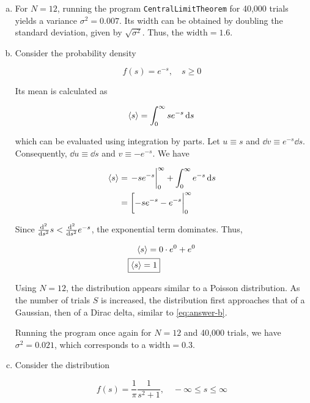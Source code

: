 \documentclass[12pt,a4paper,twocolumn]{article}
\begin{document}
\begin{enumerate}[(a)]
\item For $N = 12$, running the program \texttt{CentralLimitTheorem} for 40,000 trials yields a variance $\sigma^2 = 0.007$. Its width can be obtained by doubling the standard deviation, given by $\sqrt{\sigma^2}$. Thus, the $\boxed{\mathrm{width} = 1.6}$.

\item Consider the probability density

\begin{equation}
	f(s) = e^{-s} , \quad s \geq 0
\end{equation}

Its mean is calculated as 

\begin{equation}
	\ev{s} = \int_0^\infty se^{-s} \dd{s} \\
\end{equation}

which can be evaluated using integration by parts. Let $u \equiv s$ and $\dd{v} \equiv e^{-s} \dd{s}$. Consequently, $\dd{u} \equiv \dd{s}$ and $v \equiv -e^{-s}$. We have

\begin{align}
	\ev{s} &= \eval{-se^{-s}}_0^\infty + \int_0^\infty e^{-s} \dd{s} \\
	&= \eval[-se^{-s} - e^{-s} |_0^\infty \nonumber
\end{align}

Since $\dv[2]{s}s < \dv[2]{s}e^{-s}$, the exponential term dominates. Thus,

\begin{align}
	\ev{s} &= 0\cdot e^0 + e^0 \nonumber \\
	\Aboxed{
		\ev{s} &= 1
	} \label{eq:answer-d-mean}
\end{align}

Using $N = 12$, the distribution appears similar to a Poisson distribution. As the number of trials $S$ is increased, the distribution first approaches that of a Gaussian, then of a Dirac delta, similar to \eqref{eq:answer-b}.

Running the program once again for $N=12$ and 40,000 trials, we have $\sigma^2 = 0.021$, which corresponds to a $\boxed{\mathrm{width} = 0.3}$.

\item Consider the distribution

\begin{equation}\label{eq:lorentz}
	f(s) = \frac{1}{\pi} \frac{1}{s^2 + 1}, \quad -\infty \leq s \leq \infty
\end{equation}


\end{enumerate}
\end{document}
